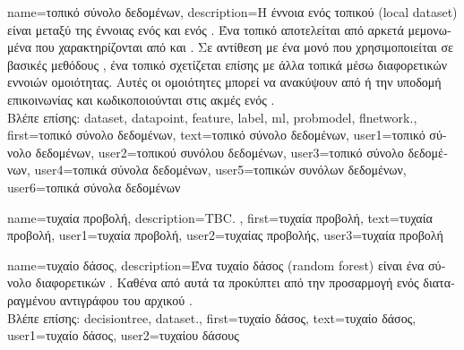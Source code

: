 {name={\foreignlanguage{greek}{τοπικό σύνολο δεδομένων}},
	description={\foreignlanguage{greek}{Η έννοια ενός τοπικού}   
		(local dataset) \foreignlanguage{greek}{εί\-ναι μεταξύ της έννοιας ενός}  \foreignlanguage{greek}{και ενός} 
		. \foreignlanguage{greek}{Ένα τοπικό}  \foreignlanguage{greek}{αποτελείται από αρκετά μεμονωμένα} 
		 \foreignlanguage{greek}{που χαρακτηρίζονται από}  \foreignlanguage{greek}{και} 
		. \foreignlanguage{greek}{Σε αντίθεση με ένα μονό}  \foreignlanguage{greek}{που 
		χρησιμοποιείται σε βασικές μεθόδους} , \foreignlanguage{greek}{ένα τοπικό}  
		\foreignlanguage{greek}{σχετίζεται επίσης με άλλα τοπικά}  \foreignlanguage{greek}{μέσω διαφορετικών εννοιών 
		ομοιότητας. Αυτές οι ομοιότητες μπορεί να ανακύψουν από}  \foreignlanguage{greek}{ή την υποδομή επικοινωνίας 
		και κωδικοποιούνται στις ακμές ενός} .
		\\
		\foreignlanguage{greek}{Βλέπε επίσης:} \gls{dataset}, \gls{datapoint}, \gls{feature}, \gls{label}, \gls{ml}, \gls{probmodel}, \gls{flnetwork}.},
	first={\foreignlanguage{greek}{τοπικό σύνολο δεδομένων}},
	text={\foreignlanguage{greek}{τοπικό σύνολο δεδομένων}},
	user1={\foreignlanguage{greek}{τοπικό σύνολο δεδομένων}}, %
	user2={\foreignlanguage{greek}{τοπικού συνόλου δεδομένων}}, %
	user3={\foreignlanguage{greek}{τοπικό σύνολο δεδομένων}}, %
	user4={\foreignlanguage{greek}{τοπικά σύνολα δεδομένων}}, %
	user5={\foreignlanguage{greek}{τοπικών συνόλων δεδομένων}}, %
	user6={\foreignlanguage{greek}{τοπικά σύνολα δεδομένων}} %
}

{name={\foreignlanguage{greek}{τυχαία προβολή}}, 
	description={TBC. },
	first={\foreignlanguage{greek}{τυχαία προβολή}},
	text={\foreignlanguage{greek}{τυχαία προβολή}},
	user1={\foreignlanguage{greek}{τυχαία προβολή}}, %
	user2={\foreignlanguage{greek}{τυχαίας προβολής}}, %
	user3={\foreignlanguage{greek}{τυχαία προβολή}} %
}

{name={\foreignlanguage{greek}{τυχαίο δάσος}},
	description={\foreignlanguage{greek}{Ένα τυχαίο δάσος} (random forest) 
		\foreignlanguage{greek}{είναι ένα σύνολο διαφορετικών} . 
		\foreignlanguage{greek}{Καθένα από αυτά τα}  \foreignlanguage{greek}{προκύπτει από την προσαρμογή 
		ενός διαταραγμένου αντιγράφου του αρχικού} .
		\\
		\foreignlanguage{greek}{Βλέπε επίσης:} \gls{decisiontree}, \gls{dataset}.},
	first={\foreignlanguage{greek}{τυχαίο δάσος}}, 
	text={\foreignlanguage{greek}{τυχαίο δάσος}},
	user1={\foreignlanguage{greek}{τυχαίο δάσος}}, %
	user2={\foreignlanguage{greek}{τυχαίου δάσους}} %
}

